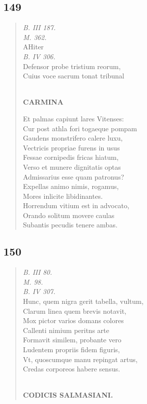 \documentclass[11pt, a4paper]{report}
\begin{document}
            \subsection*{149}
      \begin{verse}
      \textit{B. III 187.} \\ \textit{M. 362.} \\ AHiter \\ \textit{B. IV 306.} \\ Defensor probe tristium reorum, \\ Cuius voce sacrum tonat tribunal \\ 
        ﻿\pagebreak 
    \begin{center} \textbf{CARMINA} \end{center} \marginpar{[144]} Et palmas capiunt lares Vitenses: \\ Cur post athla fori togaeque pompam \\ Gaudens monstrifero calere luxu, \\ Vectricis propriae furens in usus \\ Fessae cornipedis fricas hiatum, \\ Verso et munere dignitatis optas \\ Admissarius esse quam patronus? \\ Expellas animo nimis, rogamus, \\ Mores inlicite libidinantes. \\ Horrendum vitium est in advocato, \\ Orando solitum movere caulas \\ Subantis pecudis tenere ambas. \\ 
      \end{verse}
  
            \subsection*{150}
      \begin{verse}
      \textit{B. III 80.} \\ \textit{M. 98.} \\ \textit{B. IV 307.} \\ Hunc, quem nigra gerit tabella, vultum, \\ Clarum linea quem brevis notavit, \\ Mox pictor varios domans colores \\ Callenti nimium peritns arte \\ Formavit similem, probante vero \\ Ludentem propriis fidem figuris, \\ Vt, quoscumque manu repingat artus, \\ Credas corporeos habere sensus. \\ 
        ﻿\pagebreak 
    \begin{center} \textbf{CODICIS SALMASIANI.} \end{center} \marginpar{[145]} 
      \end{verse}
  
\end{document}
